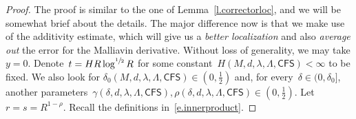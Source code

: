 \documentclass[11pt]{article} %
\numberwithin{equation}{section}
\theoremstyle{definition}
\newcommand{\CFS}{\mathsf{CFS}}
\begin{document}
\begin{proof}
The proof is similar to the one of Lemma~\ref{l.correctorloc}, and we will be somewhat brief about the details. The major difference now is that we make use of the additivity estimate, which will give us a \emph{better localization} and also \emph{average out} the error for the Malliavin derivative. Without loss of generality, we may take $y = 0$. Denote~$t = H R \log^{\sfrac 12} R$ for some constant~$H(M,d,\lambda,\Lambda,\CFS)<\infty$ to be fixed. We also look for $\delta_0(M,d,\lambda,\Lambda,\CFS) \in (0,\frac12)$ and, for every~$\delta \in (0,\delta_0]$, another parameters~$\gamma(\delta,d,\lambda,\Lambda,\CFS),\rho(\delta,d,\lambda,\Lambda,\CFS) \in (0,\frac12)$. Let~$r = s = R^{1-\rho}$. Recall the definitions in~\eqref{e.innerproduct}. 

\smallskip


\end{proof}
\end{document}
